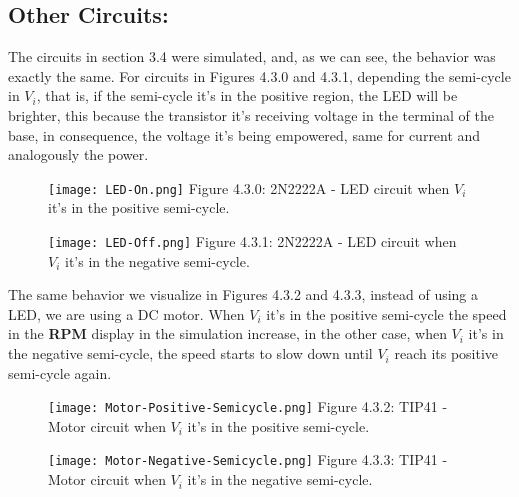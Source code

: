 \subsection{Other Circuits:}

The circuits in section 3.4 were simulated, and, as we can see, the behavior was exactly the same. For circuits in Figures 4.3.0 and 4.3.1, depending the semi-cycle in $V_{i}$, that is, if the semi-cycle it's in the positive region, the LED will be brighter, this because the transistor it's receiving voltage in the terminal of the base, in consequence, the voltage it's being empowered, same for current and analogously the power. \hfill \break

\begin{multicols}{2}
\begin{figure}[H]
\texttt{[image: LED-On.png]}
\centering \linebreak \linebreak Figure 4.3.0:  2N2222A - LED circuit when $V_{i}$ it's in the positive semi-cycle.
\end{figure}

\begin{figure}[H]
\texttt{[image: LED-Off.png]}
\centering \linebreak \linebreak Figure 4.3.1: 2N2222A - LED circuit when $V_{i}$ it's in the negative semi-cycle.
\end{figure}
\end{multicols} \hfill

The same behavior we visualize in Figures 4.3.2 and 4.3.3, instead of using a LED, we are using a DC motor. When $V_{i}$ it's in the positive semi-cycle the speed in the {\bfseries RPM} display in the simulation increase, in the other case, when $V_{i}$ it's in the negative semi-cycle, the speed starts to slow down until $V_{i}$ reach its positive semi-cycle again. \hfill \break

\begin{multicols}{2}
\begin{figure}[H]
\texttt{[image: Motor-Positive-Semicycle.png]}
\centering \linebreak \linebreak Figure 4.3.2:  TIP41 - Motor circuit when $V_{i}$ it's in the positive semi-cycle.
\end{figure}

\begin{figure}[H]
\texttt{[image: Motor-Negative-Semicycle.png]}
\centering \linebreak \linebreak Figure 4.3.3: TIP41 - Motor circuit when $V_{i}$ it's in the negative semi-cycle.
\end{figure}
\end{multicols} \hfill

{\bfseries\itshape\color{carmine}{Observation:}} {\itshape{}}

\pagebreak